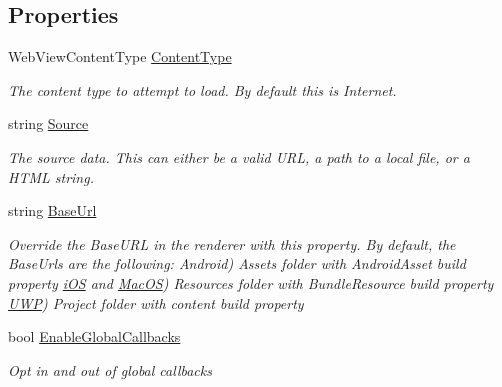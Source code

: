 \subsection*{Properties}
\begin{DoxyCompactItemize}
\item 
Web\+View\+Content\+Type \hyperlink{class_xam_1_1_plugin_1_1_web_view_1_1_abstractions_1_1_forms_web_view_a7066440f9f0f094ba9266c43e1d940b3}{Content\+Type}
\begin{DoxyCompactList}\small\item\em The content type to attempt to load. By default this is Internet. \end{DoxyCompactList}\item 
string \hyperlink{class_xam_1_1_plugin_1_1_web_view_1_1_abstractions_1_1_forms_web_view_a67fca633a4ffb71e594925ba81250c6b}{Source}
\begin{DoxyCompactList}\small\item\em The source data. This can either be a valid U\+RL, a path to a local file, or a H\+T\+ML string. \end{DoxyCompactList}\item 
string \hyperlink{class_xam_1_1_plugin_1_1_web_view_1_1_abstractions_1_1_forms_web_view_aa31fde920a7f9a83919ce02291fec4c6}{Base\+Url}
\begin{DoxyCompactList}\small\item\em Override the Base\+U\+RL in the renderer with this property. By default, the Base\+Urls are the following\+: Android) Assets folder with Android\+Asset build property \hyperlink{namespace_xam_1_1_plugin_1_1_web_view_1_1i_o_s}{i\+OS} and \hyperlink{namespace_xam_1_1_plugin_1_1_web_view_1_1_mac_o_s}{Mac\+OS}) Resources folder with Bundle\+Resource build property \hyperlink{namespace_xam_1_1_plugin_1_1_web_view_1_1_u_w_p}{U\+WP}) Project folder with content build property \end{DoxyCompactList}\item 
bool \hyperlink{class_xam_1_1_plugin_1_1_web_view_1_1_abstractions_1_1_forms_web_view_a1aa4c45b99c24d381fbe978a3d85cb25}{Enable\+Global\+Callbacks}
\begin{DoxyCompactList}\small\item\em Opt in and out of global callbacks \end{DoxyCompactList}\item 

\end{DoxyCompactItemize}
